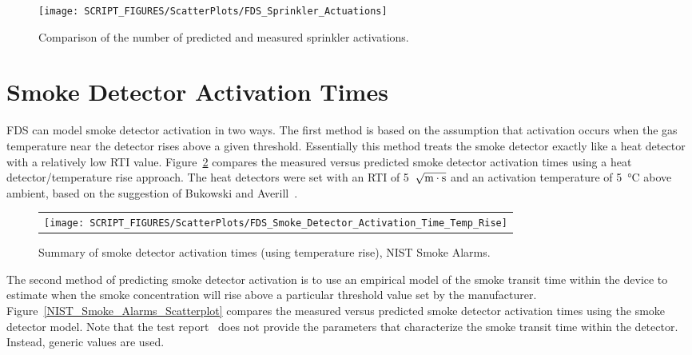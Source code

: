 \begin{figure}[p]
\begin{center}
\texttt{[image: SCRIPT\_FIGURES/ScatterPlots/FDS\_Sprinkler\_Actuations]}
\end{center}
\caption[Comparison of the number of predicted and measured sprinkler activations]
{Comparison of the number of predicted and measured sprinkler activations.}
\label{UL_NFPRF}
\end{figure}




\clearpage

\section{Smoke Detector Activation Times}
\label{Smoke Detector Activation Time}
\label{Smoke Detector Activation Time, Temp. Rise}

FDS can model smoke detector activation in two ways. The first method is based on the assumption that activation occurs when the gas temperature near the detector rises above a given threshold. Essentially this method treats the smoke detector exactly like a heat detector with a relatively low RTI value. Figure~\ref{NIST_Smoke_Alarms_Scatterplot_Temp_Rise} compares the measured versus predicted smoke detector activation times using a heat detector/temperature rise approach. The heat detectors were set with an RTI of 5~$\sqrt{\hbox{m}\cdot \hbox{s}}$ and an activation temperature of \SI{5}{\celsius} above ambient, based on the suggestion of Bukowski and Averill~\cite{Bukowski:2}.

\begin{figure}[!h]
\begin{center}
\begin{tabular}{c}
\texttt{[image: SCRIPT\_FIGURES/ScatterPlots/FDS\_Smoke\_Detector\_Activation\_Time\_Temp\_Rise]}
\end{tabular}
\end{center}
\caption[Summary of smoke detector activation times (temperature rise), NIST Smoke Alarms]
{Summary of smoke detector activation times (using temperature rise), NIST Smoke Alarms.}
\label{NIST_Smoke_Alarms_Scatterplot_Temp_Rise}
\end{figure}

The second method of predicting smoke detector activation is to use an empirical model of the smoke transit time within the device to estimate when the smoke concentration will rise above a particular threshold value set by the manufacturer. Figure~\ref{NIST_Smoke_Alarms_Scatterplot} compares the measured versus predicted smoke detector activation times using the smoke detector model. Note that the test report~\cite{Bukowski:1} does not provide the parameters that characterize the smoke transit time within the detector. Instead, generic values are used.


